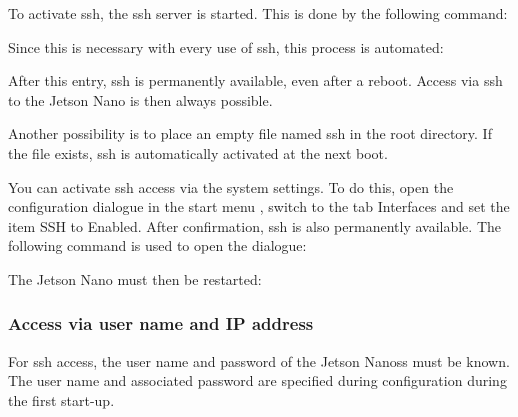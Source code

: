 To activate \ac{ssh}, the \ac{ssh} server is started. This is done by the following command:

\medskip


\medskip

Since this is necessary with every use of \ac{ssh}, this process is automated:

\medskip


\medskip

After this entry, \ac{ssh} is permanently available, even after a reboot. Access via \ac{ssh} to the Jetson Nano is then always possible.

\bigskip

Another possibility is to place an empty file named \glqq ssh\grqq{} in the root directory. If the file exists, \ac{ssh} is automatically activated at the next boot.

\bigskip

You can activate \ac{ssh} access via the system settings. To do this, open the configuration dialogue in the start menu , switch to the tab \glqq Interfaces\grqq{} and set the item \glqq SSH\grqq{} to \glqq Enabled\grqq{}. After confirmation, \ac{ssh} is also permanently available. The following command is used to open the dialogue:

\medskip


\medskip

The Jetson Nano must then be restarted:

\medskip



\subsubsection{Access via user name and IP address}

For \ac{ssh} access, the user name and password of the Jetson Nanoss must be known. The user name and associated password are specified during configuration during the first start-up.


